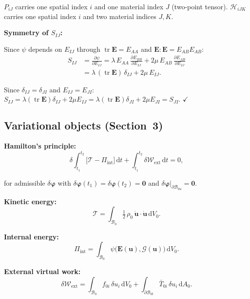 \documentclass[11pt]{article}
\DeclareMathOperator{\tr}{tr}
\newcommand{\bp}{\boldsymbol{\varphi}}
\newcommand{\bu}{\mathbf{u}}
\newcommand{\bp}{\boldsymbol{\varphi}}
\newcommand{\bu}{\mathbf{u}}
\begin{document}
$P_{iJ}$ carries one spatial index $i$ and one material index $J$
(two-point tensor). $\mathcal{H}_{iJK}$ carries one spatial index $i$
and two material indices $J,K$.

\textbf{Symmetry of $S_{IJ}$:}

Since $\psi$ depends on $E_{IJ}$ through $\tr\mathbf{E}=E_{AA}$ and
$\mathbf{E}:\mathbf{E}=E_{AB}E_{AB}$:
\begin{align}
S_{IJ} &= \frac{\partial\psi}{\partial E_{IJ}}
= \lambda\,E_{AA}\,\frac{\partial E_{BB}}{\partial E_{IJ}}
  + 2\mu\,E_{AB}\,\frac{\partial E_{AB}}{\partial E_{IJ}}
\nonumber\\
&= \lambda\,(\tr\mathbf{E})\,\delta_{IJ} + 2\mu\,E_{IJ}.
\end{align}

Since $\delta_{IJ}=\delta_{JI}$ and $E_{IJ}=E_{JI}$:
$S_{IJ}=\lambda(\tr\mathbf{E})\delta_{IJ}+2\mu E_{IJ}
= \lambda(\tr\mathbf{E})\delta_{JI}+2\mu E_{JI} = S_{JI}$. $\checkmark$

\subsection{Variational objects (Section~3)}

\textbf{Hamilton's principle:}
\begin{equation}
\delta\int_{t_{1}}^{t_{2}}\bigl[\mathcal{T}-\Pi_{\mathrm{int}}\bigr]
\,\mathrm{d}t
+ \int_{t_{1}}^{t_{2}}\delta\mathcal{W}_{\mathrm{ext}}\,\mathrm{d}t
= 0,
\end{equation}

for admissible $\delta\bp$ with $\delta\bp(t_{1})=\delta\bp(t_{2})=\mathbf{0}$
and $\delta\bp|_{\partial\mathcal{B}_{0u}}=\mathbf{0}$.

\textbf{Kinetic energy:}
\begin{equation}
\mathcal{T} = \int_{\mathcal{B}_{0}}
\tfrac12\,\rho_{0}\,\dot{\bu}\cdot\dot{\bu}\,
\mathrm{d}V_{0}.
\end{equation}

\textbf{Internal energy:}
\begin{equation}
\Pi_{\mathrm{int}} = \int_{\mathcal{B}_{0}}
\psi\bigl(\mathbf{E}(\bu),\bm{\mathcal{G}}(\bu)\bigr)\,
\mathrm{d}V_{0}.
\end{equation}

\textbf{External virtual work:}
\begin{equation}
\delta\mathcal{W}_{\mathrm{ext}}
= \int_{\mathcal{B}_{0}} f_{0i}\,\delta u_{i}\,\mathrm{d}V_{0}
+ \int_{\partial\mathcal{B}_{0t}} \bar{T}_{0i}\,\delta u_{i}\,
  \mathrm{d}A_{0}.
\end{equation}
\end{document}
